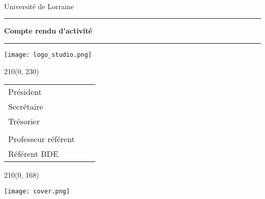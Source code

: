 \thispagestyle{empty}

{\color{primary}
	\begin{flushleft}
		\school\\
		\schoolAddress\\
		\schoolCodeAndCity\\
		Université de Lorraine\\
	\end{flushleft}

	\vspace{0.6cm}

	\begin{center}
		\rule{\textwidth}{0.8pt}

			\vspace{0.5cm}
			\baselineskip=3pt
			{\Huge \bfseries{Compte rendu d'activité}}\\
			\vspace{0.2cm}
			{\huge \bfseries{\club}}
			\vspace{0.5cm}

		\rule{\textwidth}{0.8pt}
	\end{center}

	\vspace{0.2cm}

	\begin{center}
		\texttt{[image: logo\_studio.png]}
	\end{center}

	\begin{textblock}{210}(0, 230)
			\color{white}

			\begin{center}
				{\LARGE{\schoolYear}}
			\end{center}

			\vspace{0.1cm}
			\begin{center}
			{\large
				\begin{tabular}{lcr}
					Président & \hspace{1cm} & \chair \\
					Secrétaire & & \secretary\\
					Trésorier & & \banker\\
					& & \\
					Professeur référent & & \teacher\\
					Référent BDE & & \bde\\
				\end{tabular}
			}
			\end{center}
			\color{black}
	\end{textblock}

	\begin{textblock}{210}(0, 168)
	\begin{center}
		\texttt{[image: cover.png]}
	\end{center}
	\end{textblock}
}
